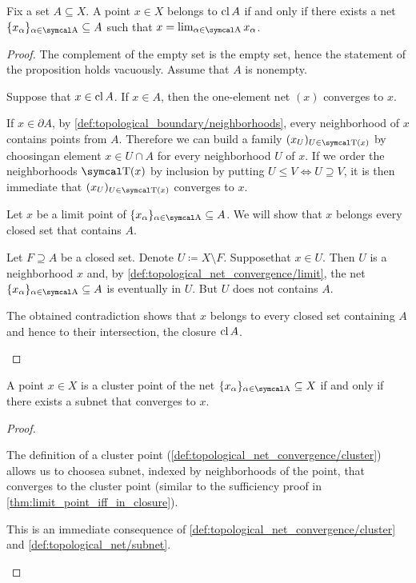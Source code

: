 \begin{proposition}\label{thm:limit_point_iff_in_closure}\cite[proposition 1.6.3]{Engelking1989}
  Fix a set \( A \subseteq X \). A point \( x \in X \) belongs to \( \operatorname{cl}{A} \) if and only if there exists a net \( \{ x_\al \}_{\al \in \CA} \subseteq A \) such that \( x = \lim_{\al \in \CA} x_\al \).
\end{proposition}
\begin{proof}
  The complement of the empty set is the empty set, hence the statement of the proposition holds vacuously. Assume that \( A \) is nonempty.

  \begin{description}
    \Implies Suppose that \( x \in \operatorname{cl}{A} \). If \( x \in A \), then the one-element net \( (x) \) converges to \( x \).

    If \( x \in \partial{A} \), by \cref{def:topological_boundary/neighborhoods}, every neighborhood of \( x \) contains points from \( A \). Therefore we can build a family \( (x_U)_{U \in \CT(x)} \) by choosing\AOC an element \( x \in U \cap A \) for every neighborhood \( U \) of \( x \). If we order the neighborhoods \( \CT(x) \) by inclusion by putting \( U \leq V \iff U \supseteq V \), it is then immediate that \( (x_U)_{U \in \CT(x)} \) converges to \( x \).

    \ImpliedBy Let \( x \) be a limit point of \( \{ x_\al \}_{\al \in \CA} \subseteq A \). We will show that \( x \) belongs every closed set that contains \( A \).

    Let \( F \supseteq A \) be a closed set. Denote \( U \coloneqq X \setminus F \). Suppose\LEM that \( x \in U \). Then \( U \) is a neighborhood \( x \) and, by \cref{def:topological_net_convergence/limit}, the net \( \{ x_\al \}_{\al \in \CA} \subseteq A \) is eventually in \( U \). But \( U \) does not contains \( A \).

    The obtained contradiction shows that \( x \) belongs to every closed set containing \( A \) and hence to their intersection, the closure \( \operatorname{cl} A \).
  \end{description}
\end{proof}

\begin{proposition}\label{thm:cluster_point_iff_in_subsequence_limit}
  A point \( x \in X \) is a cluster point of the net \( \{ x_\al \}_{\al \in \CA} \subseteq X \) if and only if there exists a subnet that converges to \( x \).
\end{proposition}
\begin{proof}
  \begin{description}
    \Implies The definition of a cluster point (\cref{def:topological_net_convergence/cluster}) allows us to choose\AOC a subnet, indexed by neighborhoods of the point, that converges to the cluster point (similar to the sufficiency proof in \cref{thm:limit_point_iff_in_closure}).

    \ImpliedBy This is an immediate consequence of \cref{def:topological_net_convergence/cluster} and \cref{def:topological_net/subnet}.
  \end{description}
\end{proof}
